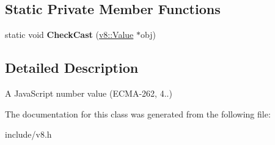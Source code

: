 \subsection*{Static Private Member Functions}
\begin{DoxyCompactItemize}
\item 
static void {\bfseries Check\+Cast} (\hyperlink{classv8_1_1_value}{v8\+::\+Value} $\ast$obj)\hypertarget{classv8_1_1_number_a722d1cad74dd79ab1653fecc8c3dafa7}{}\label{classv8_1_1_number_a722d1cad74dd79ab1653fecc8c3dafa7}

\end{DoxyCompactItemize}


\subsection{Detailed Description}
A Java\+Script number value (E\+C\+M\+A-\/262, 4..) 

The documentation for this class was generated from the following file\+:\begin{DoxyCompactItemize}
\item 
include/v8.\+h\end{DoxyCompactItemize}
